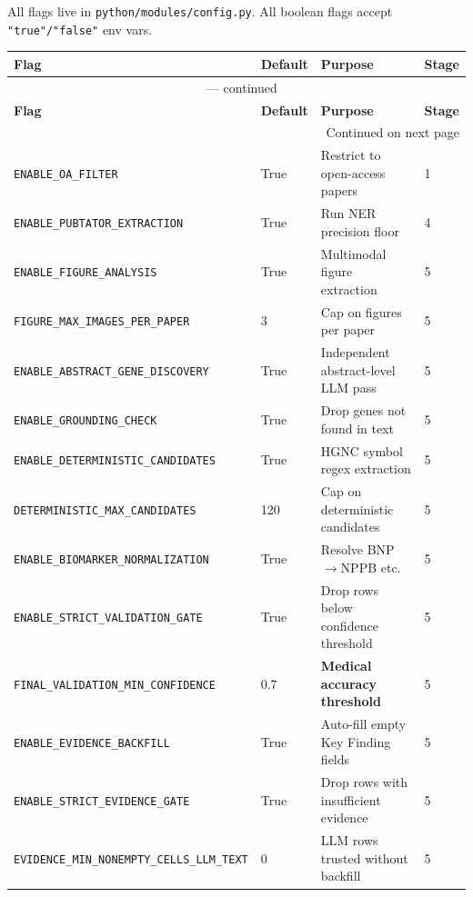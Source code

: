 \documentclass[11pt,a4paper]{article}
\newcommand{\codefile}[1]{\texttt{\small\color{gray}#1}}
\begin{document}
All flags live in \codefile{python/modules/config.py}. All boolean flags accept \texttt{"true"/"false"} env vars.

\begin{longtable}{llp{4.5cm}l}
\toprule
\textbf{Flag} & \textbf{Default} & \textbf{Purpose} & \textbf{Stage} \\
\midrule
\endfirsthead
\multicolumn{4}{c}{{\tablename\ \thetable{} --- continued}} \\
\toprule
\textbf{Flag} & \textbf{Default} & \textbf{Purpose} & \textbf{Stage} \\
\midrule
\endhead
\midrule
\multicolumn{4}{r}{{Continued on next page}} \\
\endfoot
\bottomrule
\endlastfoot

\texttt{ENABLE\_OA\_FILTER}          & True  & Restrict to open-access papers               & 1 \\
\texttt{ENABLE\_PUBTATOR\_EXTRACTION}& True  & Run NER precision floor                       & 4 \\
\texttt{ENABLE\_FIGURE\_ANALYSIS}    & True  & Multimodal figure extraction                  & 5 \\
\texttt{FIGURE\_MAX\_IMAGES\_PER\_PAPER} & 3 & Cap on figures per paper                     & 5 \\
\texttt{ENABLE\_ABSTRACT\_GENE\_DISCOVERY} & True & Independent abstract-level LLM pass      & 5 \\
\texttt{ENABLE\_GROUNDING\_CHECK}    & True  & Drop genes not found in text                  & 5 \\
\texttt{ENABLE\_DETERMINISTIC\_CANDIDATES} & True & HGNC symbol regex extraction            & 5 \\
\texttt{DETERMINISTIC\_MAX\_CANDIDATES} & 120 & Cap on deterministic candidates              & 5 \\
\texttt{ENABLE\_BIOMARKER\_NORMALIZATION} & True & Resolve BNP$\to$NPPB etc.                 & 5 \\
\texttt{ENABLE\_STRICT\_VALIDATION\_GATE} & True & Drop rows below confidence threshold     & 5 \\
\texttt{FINAL\_VALIDATION\_MIN\_CONFIDENCE} & 0.7 & \textbf{Medical accuracy threshold}      & 5 \\
\texttt{ENABLE\_EVIDENCE\_BACKFILL}  & True  & Auto-fill empty Key Finding fields            & 5 \\
\texttt{ENABLE\_STRICT\_EVIDENCE\_GATE} & True & Drop rows with insufficient evidence       & 5 \\
\texttt{EVIDENCE\_MIN\_NONEMPTY\_CELLS\_LLM\_TEXT} & 0 & LLM rows trusted without backfill   & 5 \\

\end{longtable}
\end{document}
